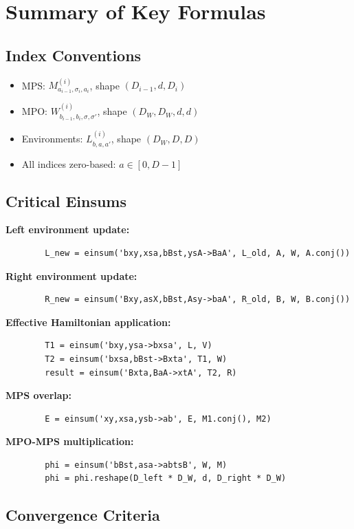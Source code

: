 \documentclass[aps,prb,onecolumn,scriptaddress]{revtex4-2}
\begin{document}
	\section{Summary of Key Formulas}
	
	\subsection{Index Conventions}
	\begin{itemize}
		\item MPS: $M^{(i)}_{a_{i-1}, \sigma_i, a_i}$, shape $(D_{i-1}, d, D_i)$
		\item MPO: $W^{(i)}_{b_{i-1}, b_i, \sigma, \sigma'}$, shape $(D_W, D_W, d, d)$
		\item Environments: $L^{(i)}_{b, a, a'}$, shape $(D_W, D, D)$
		\item All indices zero-based: $a \in [0, D-1]$
	\end{itemize}
	
	\subsection{Critical Einsums}
	
	\textbf{Left environment update:}
	\begin{verbatim}
		L_new = einsum('bxy,xsa,bBst,ysA->BaA', L_old, A, W, A.conj())
	\end{verbatim}
	
	\textbf{Right environment update:}
	\begin{verbatim}
		R_new = einsum('Bxy,asX,bBst,Asy->baA', R_old, B, W, B.conj())
	\end{verbatim}
	
	\textbf{Effective Hamiltonian application:}
	\begin{verbatim}
		T1 = einsum('bxy,ysa->bxsa', L, V)
		T2 = einsum('bxsa,bBst->Bxta', T1, W)
		result = einsum('Bxta,BaA->xtA', T2, R)
	\end{verbatim}
	
	\textbf{MPS overlap:}
	\begin{verbatim}
		E = einsum('xy,xsa,ysb->ab', E, M1.conj(), M2)
	\end{verbatim}
	
	\textbf{MPO-MPS multiplication:}
	\begin{verbatim}
		phi = einsum('bBst,asa->abtsB', W, M)
		phi = phi.reshape(D_left * D_W, d, D_right * D_W)
	\end{verbatim}
	
	\subsection{Convergence Criteria}
	
\end{document}
